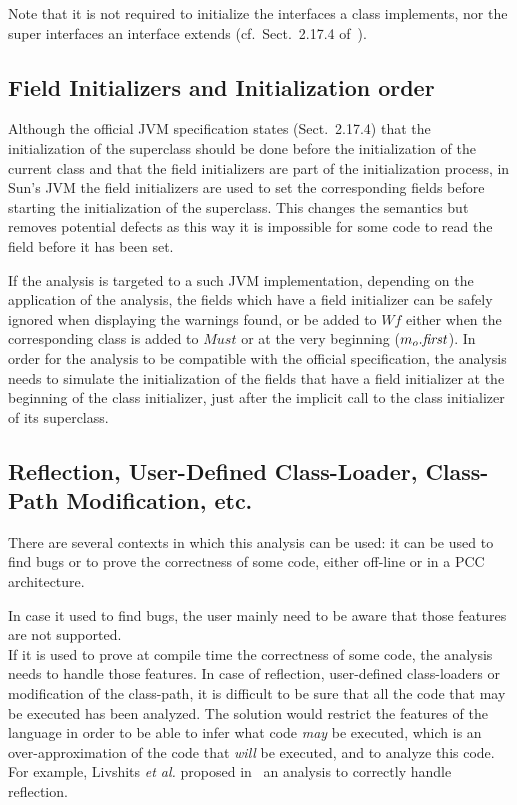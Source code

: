 \documentclass{entcs}
\newcommand{\must}{\ensuremath{\mathit{Must}}}
\newcommand{\wf}{\ensuremath{\mathit{Wf}}}
\begin{document}
Note that it is not required to initialize the interfaces a class
implements, nor the super interfaces an interface extends
(cf.~Sect.~2.17.4 of~\cite{lindholm99:jvm_spec}).








\subsection{Field Initializers and Initialization order}
\label{sec:initialization-order}

Although the official JVM specification states (Sect.~2.17.4) that the
initialization of the superclass should be done before the
initialization of the current class and that the field initializers
are part of the initialization process, in Sun's JVM the field
initializers are used to set the corresponding fields before starting
the initialization of the superclass.  This changes the semantics
but removes potential defects as this way it is impossible for some
code to read the field before it has been set.

If the analysis is targeted to a such JVM implementation, depending on
the application of the analysis, the fields which have a field
initializer can be safely ignored when displaying the warnings found,
or be added to \wf{} either when the corresponding class is added to
$\must$ or at the very beginning ($m_o.\mathit{first}$).  In order for the
analysis to be compatible with the official specification, the
analysis needs to simulate the initialization of the fields that have
a field initializer at the beginning of the class initializer, just
after the implicit call to the class initializer of its superclass.

\subsection{Reflection, User-Defined Class-Loader, Class-Path
  Modification, etc.}
\label{sec:reflection}
There are several contexts in which this analysis can be used: it can
be used to find bugs or to prove the correctness of some code, either
off-line or in a PCC~\cite{nec97} architecture.

In case it used to find bugs, the user mainly need to be aware that
those features are not supported.
\\
If it is used to prove at compile time the correctness of some code,
the analysis needs to handle those features.  In case of reflection,
user-defined class-loaders or modification of the class-path, it is
difficult to be sure that all the code that may be executed has been
analyzed.  The solution would restrict the features of the language in
order to be able to infer what code \emph{may} be executed, which is
an over-approximation of the code that \emph{will} be executed, and to
analyze this code.  For example, Livshits \emph{et al.} proposed
in~\cite{livshits05} an analysis to correctly handle reflection.
\end{document}
